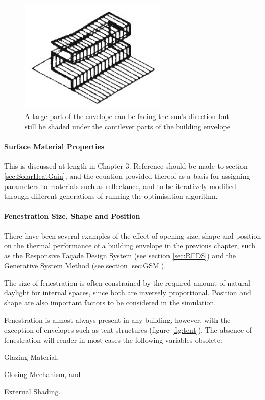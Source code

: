 \begin{figure}[H]
	\centering
	\includegraphics[width=7cm]{./Images/7-Cantilever}
	\caption[Envelope Shading]{A large part of the envelope can be facing the sun's direction but still be shaded under the cantilever parts of the building envelope \cite{foa04}}
	\label{fig:ShadingCntlvr}
\end{figure}

\paragraph{Surface Material Properties}\mbox{}

This is discussed at length in Chapter 3. Reference should be made to section \ref{sec:SolarHeatGain}, and the equation provided thereof as a basis for assigning parameters to materials such as reflectance, and to be iteratively modified through different generations of running the optimisation algorithm.

\paragraph{Fenestration Size, Shape and Position}\mbox{}

There have been several examples of the effect of opening size, shape and position on the thermal performance of a building envelope in the previous chapter, such as the Responsive Fa\c{c}ade Design System (see section \ref{sec:RFDS}) and the Generative System Method (see section \ref{sec:GSM}).

The size of fenestration is often constrained by the required amount of natural daylight for internal spaces, since both are inversely proportional. Position and shape are also important factors to be considered in the simulation.

Fenestration is almost always present in any building, however, with the exception of envelopes such as tent structures (figure \ref{fig:tent}). The absence of fenestration will render in most cases the following variables obsolete: \begin{inparaenum} \item Glazing Material, \item Closing Mechanism, and \item External Shading.\end{inparaenum}

